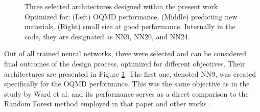 \begin{figure}[H]
    \centering
    \hspace{6pt}
    \hspace{6pt}
    \caption{Three selected architectures designed within the present work. Optimized for: (Left) OQMD performance, (Middle) predicting new materials, (Right) small size at good performance. Internally in the code, they are designated as NN9, NN20, and NN24.}
    \label{sipfenn:fig:architectures}
\end{figure}

Out of all trained neural networks, three were selected and can be considered final outcomes of the design process, optimized for different objectives. Their architectures are presented in Figure \ref{sipfenn:fig:architectures}. The first one, denoted NN9, was created specifically for the OQMD performance. This was the same objective as in the study by Ward et al. \cite{Ward2017IncludingTessellations} and its performance serves as a direct comparison to the Random Forest method employed in that paper \cite{Ward2017IncludingTessellations} and other works \cite{Schutt2014HowProperties, Seko2017RepresentationProperties}.


